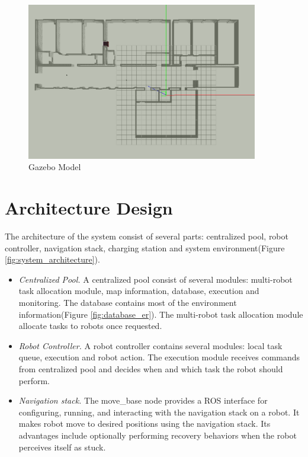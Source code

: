 \begin{figure}[htbp]
	\centering
	\includegraphics[width = 0.9\textwidth]{content/images/ch3/gazebo_model.png}
	\caption{Gazebo Model}
	\label{fig:gazebo_model}
\end{figure}

\section{Architecture Design}

The architecture of the system consist of several parts: centralized pool, robot controller, navigation stack, charging station and system environment(Figure \ref{fig:system_architecture}). 
\begin{itemize}
	\item \textsl{Centralized Pool.} A centralized pool consist of several modules: multi-robot task allocation module, map information, database, execution and monitoring. The database contains most of the environment information(Figure \ref{fig:database_er}). The multi-robot task allocation module allocate tasks to robots once requested.
	\item \textsl{Robot Controller.} A robot controller contains several modules: local task queue, execution and robot action. The execution module receives commands from centralized pool and decides when and which task the robot should perform.
	\item \textsl{Navigation stack.} The move\_base node provides a ROS interface for configuring, running, and interacting with the navigation stack on a robot. It makes robot move to desired positions using the navigation stack. Its advantages include optionally performing recovery behaviors when the robot perceives itself as stuck\cite{move_base_node}. 
\end{itemize} 

